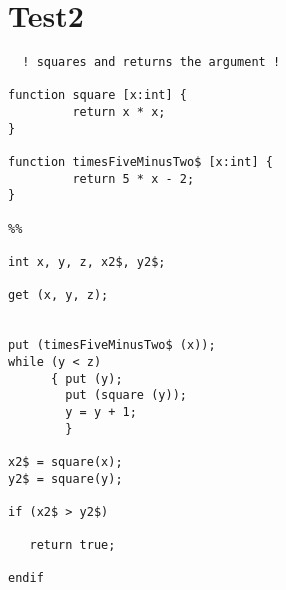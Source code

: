 \documentclass[11pt]{article}
\begin{document}
\section*{Test2}
\label{sec-2}
\begin{verbatim}
  ! squares and returns the argument !

function square [x:int] {
         return x * x;
}

function timesFiveMinusTwo$ [x:int] {
         return 5 * x - 2;
}

%%

int x, y, z, x2$, y2$;

get (x, y, z);


put (timesFiveMinusTwo$ (x));
while (y < z)
      { put (y);
        put (square (y));
        y = y + 1;
        }

x2$ = square(x);
y2$ = square(y);

if (x2$ > y2$)

   return true;

endif
\end{verbatim}
\end{document}
